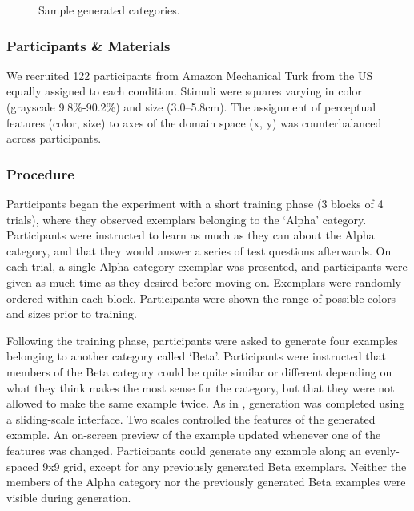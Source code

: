\documentclass[10pt,letterpaper]{article}
\newcommand\inputpgf[2]{{
\let\pgfimageWithoutPath\pgfimage
\renewcommand{\pgfimage}[2][]{\pgfimageWithoutPath[##1]{#1/##2}}

}}
\begin{document}
\begin{figure}
    \begin{center}
    \inputpgf{figs/}{beta.samples.pgf}
    \caption{Sample generated categories. }
    \label{fig:beta.samples}
    \end{center}
\end{figure}

\subsubsection{Participants \& Materials}
We recruited 122 participants from Amazon Mechanical Turk from the US equally assigned to each condition. Stimuli were squares varying in color (grayscale 9.8\%-90.2\%) and size (3.0--5.8cm). The assignment of perceptual features (color, size) to axes of the domain space (x, y) was counterbalanced across participants.


\subsubsection{Procedure}

Participants began the experiment with a short training phase (3 blocks of 4 trials), where they observed exemplars belonging to the `Alpha' category. Participants were instructed to learn as much as they can about the Alpha category, and that they would answer a series of test questions afterwards. On each trial, a single Alpha category exemplar was presented, and participants were given as much time as they desired before moving on. Exemplars were randomly ordered within each block. Participants were shown the range of possible colors and sizes prior to training.

Following the training phase, participants were asked to generate four examples belonging to another category called `Beta'. Participants were instructed that members of the Beta category could be quite similar or different depending on what they think makes the most sense for the category, but that they were not allowed to make the same example twice. As in \citet{jern2013probabilistic}, generation was completed using a sliding-scale interface. Two scales controlled the features of the generated example. An on-screen preview of the example updated whenever one of the features was changed. Participants could generate any example along an evenly-spaced 9x9 grid, except for any previously generated Beta exemplars. Neither the members of the Alpha category nor the previously generated Beta examples were visible during generation. 
\end{document}
